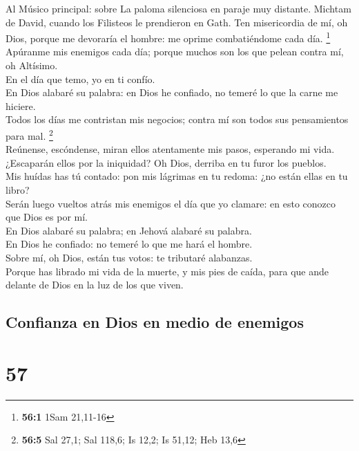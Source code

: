  Al Músico principal: sobre La paloma silenciosa en paraje
muy distante. Michtam de David, cuando los Filisteos le prendieron en
Gath. Ten misericordia de mí, oh Dios, porque me devoraría el hombre: me
oprime combatiéndome cada día. \footnote{\textbf{56:1} 1Sam 21,11-16}\\
 Apúranme mis enemigos cada día; porque muchos son los que
pelean contra mí, oh Altísimo.\\
 En el día que temo, yo en ti confío.\\
 En Dios alabaré su palabra: en Dios he confiado, no temeré
lo que la carne me hiciere.\\
 Todos los días me contristan mis negocios; contra mí son
todos sus pensamientos para mal. \footnote{\textbf{56:5} Sal 27,1; Sal
  118,6; Is 12,2; Is 51,12; Heb 13,6}\\
 Reúnense, escóndense, miran ellos atentamente mis pasos,
esperando mi vida.\\
 ¿Escaparán ellos por la iniquidad? Oh Dios, derriba en tu
furor los pueblos.\\
 Mis huídas has tú contado: pon mis lágrimas en tu redoma:
¿no están ellas en tu libro?\\
 Serán luego vueltos atrás mis enemigos el día que yo
clamare: en esto conozco que Dios es por mí.\\
 En Dios alabaré su palabra; en Jehová alabaré su
palabra.\\
 En Dios he confiado: no temeré lo que me hará el hombre.\\
 Sobre mí, oh Dios, están tus votos: te tributaré
alabanzas.\\
 Porque has librado mi vida de la muerte, y mis pies de
caída, para que ande delante de Dios en la luz de los que viven.

\hypertarget{confianza-en-dios-en-medio-de-enemigos}{%
\subsection{Confianza en Dios en medio de
enemigos}\label{confianza-en-dios-en-medio-de-enemigos}}

\hypertarget{section-56}{%
\section{57}\label{section-56}}

